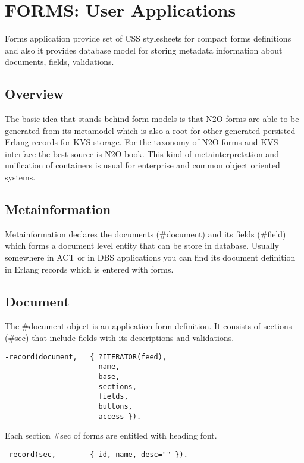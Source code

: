 \section{FORMS: User Applications}
Forms application provide set of CSS stylesheets for compact forms definitions
and also it provides database model for storing metadata information about
documents, fields, validations.

\subsection{Overview}
The basic idea that stands behind form models is that N2O forms are able to be
generated from its metamodel which is also a root for other generated
persisted Erlang records for KVS storage. For the taxonomy of N2O forms and KVS interface
the best source is N2O book. This kind of metainterpretation and unification of
containers is usual for enterprise and common object oriented systems.

\subsection{Metainformation}
Metainformation declares the documents (\#document) and its
fields (\#field) which forms a document level entity that can
be store in database. Usually somewhere in ACT or in DBS
applications you can find its document definition in Erlang
records which is entered with forms.

\subsection{Document}
The \#document object is an application form definition.
It consists of sections (\#sec) that include fields with
its descriptions and validations.

\vspace{1\baselineskip}
\begin{lstlisting}
-record(document,   { ?ITERATOR(feed),
                      name,
                      base,
                      sections,
                      fields,
                      buttons,
                      access }).
\end{lstlisting}

Each section \#sec of forms are entitled with heading font.

\vspace{1\baselineskip}
\begin{lstlisting}
-record(sec,        { id, name, desc="" }).
\end{lstlisting}


